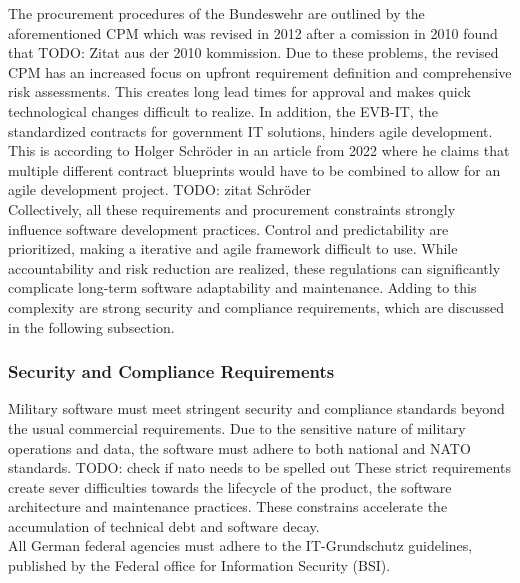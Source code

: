 The procurement procedures of the Bundeswehr are outlined by the aforementioned \ac{CPM} which was revised in 2012 after a comission in 2010 found that
TODO: Zitat aus der 2010 kommission.
Due to these problems, the revised \ac{CPM} has an increased focus on upfront requirement definition and comprehensive risk assessments. This creates long lead times
for approval and makes quick technological changes difficult to realize.
In addition, the \ac{EVB-IT}, the standardized contracts for government IT solutions, hinders agile development. This is according to Holger Schröder in an article  from 2022
where he claims that multiple different contract blueprints would have to be combined to allow for an agile development project. TODO: zitat Schröder\\

Collectively, all these requirements and procurement constraints strongly influence software development practices. Control and predictability are prioritized, making
a iterative and agile framework difficult to use. While accountability and risk reduction are realized, these regulations can significantly complicate long-term software
adaptability and maintenance. Adding to this complexity are strong security and compliance requirements, which are discussed in the following subsection.

\subsubsection{Security and Compliance Requirements}
Military software must meet stringent security and compliance standards beyond the usual commercial requirements. Due to the sensitive nature of military operations and data,
the software must adhere to both national and NATO standards. TODO: check if nato needs to be spelled out These strict requirements create sever difficulties 
towards the lifecycle of the product, the software architecture and maintenance practices. These constrains accelerate the accumulation of technical debt and software decay.\\

All German federal agencies must adhere to the IT-Grundschutz guidelines, published by the Federal office for Information Security (BSI). 